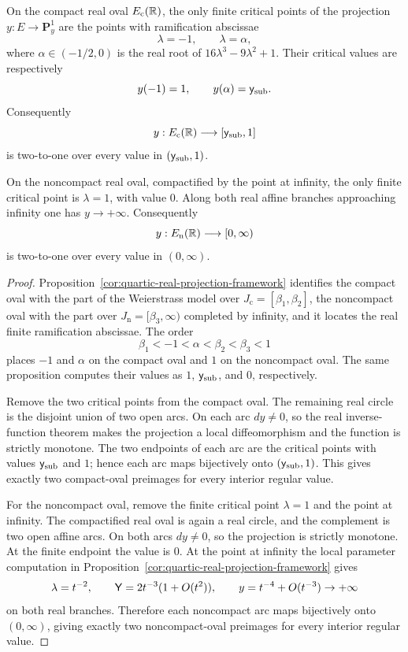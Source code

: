 \begin{lemma}\label{lem:canonical-real-oval-covering-count}
On the compact real oval \(E_{\mathrm c}(\mathbb{R})\), the only finite critical points of the projection \(y:E\to\mathbf P^1_y\) are the points with ramification abscissae
\[
\lambda=-1,
\qquad
\lambda=\alpha,
\]
where \(\alpha\in(-1/2,0)\) is the real root of \(16\lambda^3-9\lambda^2+1\).  Their critical values are respectively
\[
y(-1)=1,
\qquad
y(\alpha)=\mathsf{y}_{\mathrm{sub}}.
\]
Consequently
\[
y:E_{\mathrm c}(\mathbb{R})\longrightarrow[\mathsf{y}_{\mathrm{sub}},1]
\]
is two-to-one over every value in \((\mathsf{y}_{\mathrm{sub}},1)\).

On the noncompact real oval, compactified by the point at infinity, the only finite critical point is \(\lambda=1\), with value \(0\).  Along both real affine branches approaching infinity one has \(y\to+\infty\).  Consequently
\[
y:E_{\mathrm n}(\mathbb{R})\longrightarrow[0,\infty)
\]
is two-to-one over every value in \((0,\infty)\).
\end{lemma}
\begin{proof}
Proposition~\ref{cor:quartic-real-projection-framework} identifies the compact oval with the part of the Weierstrass model over \(J_{\mathrm c}=[\beta_1,\beta_2]\), the noncompact oval with the part over \(J_{\mathrm n}=[\beta_3,\infty)\) completed by infinity, and it locates the real finite ramification abscissae.  The order
\[
\beta_1<-1<\alpha<\beta_2<\beta_3<1
\]
places \(-1\) and \(\alpha\) on the compact oval and \(1\) on the noncompact oval.  The same proposition computes their values as \(1\), \(\mathsf{y}_{\mathrm{sub}}\), and \(0\), respectively.

Remove the two critical points from the compact oval.  The remaining real circle is the disjoint union of two open arcs.  On each arc \(dy\ne0\), so the real inverse-function theorem makes the projection a local diffeomorphism and the function is strictly monotone.  The two endpoints of each arc are the critical points with values \(\mathsf{y}_{\mathrm{sub}}\) and \(1\); hence each arc maps bijectively onto \((\mathsf{y}_{\mathrm{sub}},1)\).  This gives exactly two compact-oval preimages for every interior regular value.

For the noncompact oval, remove the finite critical point \(\lambda=1\) and the point at infinity.  The compactified real oval is again a real circle, and the complement is two open affine arcs.  On both arcs \(dy\ne0\), so the projection is strictly monotone.  At the finite endpoint the value is \(0\).  At the point at infinity the local parameter computation in Proposition~\ref{cor:quartic-real-projection-framework} gives
\[
\lambda=t^{-2},
\qquad
\mathsf{Y}=2t^{-3}(1+O(t^2)),
\qquad
y=t^{-4}+O(t^{-3})\to+\infty
\]
on both real branches.  Therefore each noncompact arc maps bijectively onto \((0,\infty)\), giving exactly two noncompact-oval preimages for every interior regular value.
\end{proof}

